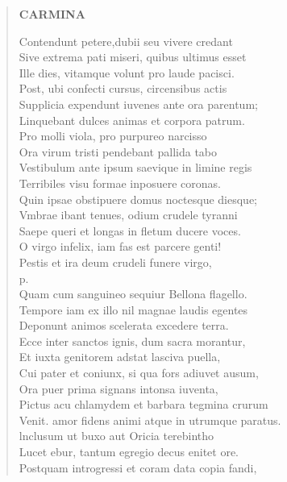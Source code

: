 \documentclass[11pt, a4paper]{report}
\begin{document}
\begin{verse}
    \begin{center} \textbf{CARMINA} \end{center} \marginpar{[42]} Contendunt petere,dubii seu vivere credant \\  \lbrack Sive extrema pati miseri, quibus ultimus esset \rbrack  \\ Ille dies, vitamque volunt pro laude pacisci. \\ Post, ubi confecti cursus, circensibus actis \\ Supplicia expendunt iuvenes ante ora parentum; \\ Linquebant dulces animas et corpora patrum. \\ Pro molli viola, pro purpureo narcisso \\ Ora virum tristi pendebant pallida tabo \\ Vestibulum ante ipsum saevique in limine regis \\ Terribiles visu formae inposuere coronas. \\ Quin ipsae obstipuere domus noctesque diesque; \\ Vmbrae ibant tenues, odium crudele tyranni \\ Saepe queri et longas in fletum ducere voces. \\ O virgo infelix, iam fas est parcere genti! \\ Pestis et ira deum crudeli funere virgo, \\ p. \\ Quam cum sanguineo sequiur Bellona flagello. \\ Tempore iam ex illo nil magnae laudis egentes \\ Deponunt animos scelerata excedere terra. \\ Ecce inter sanctos ignis, dum sacra morantur, \\ Et iuxta genitorem adstat lasciva puella, \\ Cui pater et coniunx, si qua fors adiuvet ausum, \\ Ora puer prima signans intonsa iuventa, \\ Pictus acu chlamydem et barbara tegmina crurum \\ Venit. amor fidens animi  \lbrack atque \rbrack  in utrumque paratus. \\  \lbrack lnclusum ut buxo aut Oricia terebintho \rbrack  \\ Lucet ebur, tantum egregio decus enitet ore. \\ Postquam introgressi et coram data copia fandi, \\ 

\end{verse}
\end{document}

